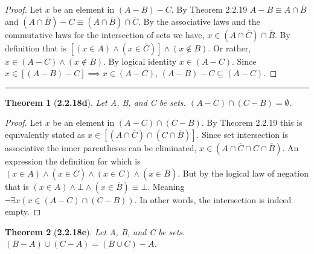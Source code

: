 \documentclass[a4paper, 12pt]{article}
\theoremstyle{plain}
\newtheorem*{theorem*}{Theorem}
\begin{document}
\begin{proof}
    Let $x$ be an element in $(A - B) - C$. By Theorem 2.2.19 $A - B \equiv A \cap \overline{B}$ and 
    $(A \cap \overline{B}) - C \equiv (A \cap \overline{B}) \cap \overline{C}$. By the 
    associative laws and the commutative laws for the intersection of sets we have, 
    $x \in (A \cap \overline{C}) \cap \overline{B}$. By definition that is 
    $[(x \in A) \land (x \in \overline{C})] \land (x \notin B)$. Or rather, 
    $x \in (A - C) \land (x \notin B)$. By logical identity $x \in (A - C)$. Since 
    $x \in [(A - B) - C] \implies x \in (A - C)$, $(A - B) - C \subseteq (A - C)$.
\end{proof}
\begin{center}
    \rule{5.4in}{1pt}
\end{center}


\begin{theorem*}[\textbf{2.2.18d}]
    Let A, B, and C be sets. $(A - C) \cap (C - B) = \emptyset$.
\end{theorem*}

\begin{proof}
    Let $x$ be an element in $(A - C) \cap (C - B)$. By Theorem 2.2.19 this is equivalently stated as 
    $x \in [(A \cap \overline{C}) \cap (C \cap \overline{B})]$. Since set intersection is 
    associative the inner parentheses can be eliminated, 
    $x \in (A \cap \overline{C} \cap C \cap \overline{B})$. An expression the definition for which 
    is $(x \in A) \land (x \in \overline{C}) \land (x \in C) \land (x \in \overline{B})$. But by the 
    logical law of negation that is 
    $(x \in A) \land \bot \land (x \in \overline{B}) \equiv \bot$. Meaning 
    $\lnot \exists x (x \in (A - C) \cap (C - B))$. In other words, the intersection is indeed empty.
\end{proof}

\pagebreak


\begin{theorem*}[\textbf{2.2.18e}]
    Let A, B, and C be sets. $(B - A) \cup (C - A) = (B \cup C) - A$.
\end{theorem*}
\end{document}
